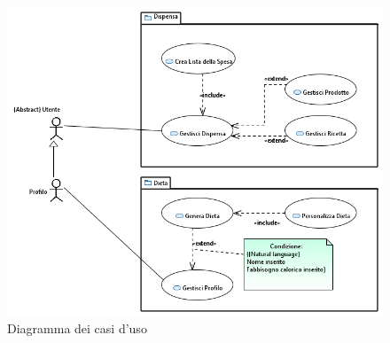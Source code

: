 \documentclass{article}
\begin{document}
\begin{figure}[H]
    \centering
    \includegraphics[width=\textwidth]{imgs/UseCaseDIagram_0.1.0.png}
    \caption{Diagramma dei casi d'uso}
    \label{fig:enter-label}
\end{figure}


\end{document}
